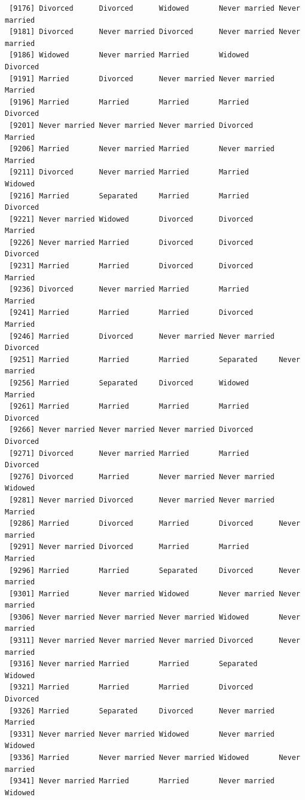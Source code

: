 \documentclass[
  letterpaper,
  DIV=11,
  numbers=noendperiod,
  oneside]{scrartcl}
\begin{document}
\begin{verbatim}
 [9176] Divorced      Divorced      Widowed       Never married Never married
 [9181] Divorced      Never married Divorced      Never married Never married
 [9186] Widowed       Never married Married       Widowed       Divorced     
 [9191] Married       Divorced      Never married Never married Married      
 [9196] Married       Married       Married       Married       Divorced     
 [9201] Never married Never married Never married Divorced      Married      
 [9206] Married       Never married Married       Never married Married      
 [9211] Divorced      Never married Married       Married       Widowed      
 [9216] Married       Separated     Married       Married       Divorced     
 [9221] Never married Widowed       Divorced      Divorced      Married      
 [9226] Never married Married       Divorced      Divorced      Divorced     
 [9231] Married       Married       Divorced      Divorced      Married      
 [9236] Divorced      Never married Married       Married       Married      
 [9241] Married       Married       Married       Divorced      Married      
 [9246] Married       Divorced      Never married Never married Divorced     
 [9251] Married       Married       Married       Separated     Never married
 [9256] Married       Separated     Divorced      Widowed       Married      
 [9261] Married       Married       Married       Married       Divorced     
 [9266] Never married Never married Never married Divorced      Divorced     
 [9271] Divorced      Never married Married       Married       Divorced     
 [9276] Divorced      Married       Never married Never married Widowed      
 [9281] Never married Divorced      Never married Never married Married      
 [9286] Married       Divorced      Married       Divorced      Never married
 [9291] Never married Divorced      Married       Married       Married      
 [9296] Married       Married       Separated     Divorced      Never married
 [9301] Married       Never married Widowed       Never married Never married
 [9306] Never married Never married Never married Widowed       Never married
 [9311] Never married Never married Never married Divorced      Never married
 [9316] Never married Married       Married       Separated     Widowed      
 [9321] Married       Married       Married       Divorced      Divorced     
 [9326] Married       Separated     Divorced      Never married Married      
 [9331] Never married Never married Widowed       Never married Widowed      
 [9336] Married       Never married Never married Widowed       Never married
 [9341] Never married Married       Married       Never married Widowed      

\end{verbatim}
\end{document}
